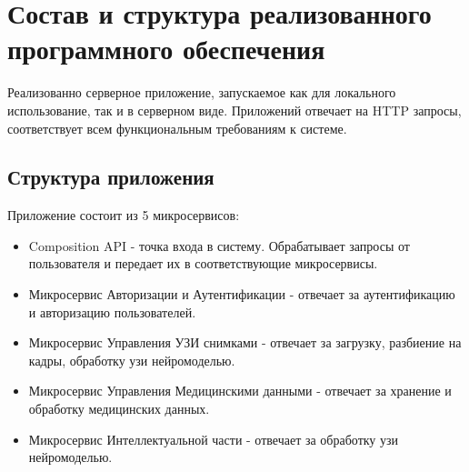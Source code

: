 


% 


\section{Состав и структура реализованного программного обеспечения}

Реализованно серверное приложение, запускаемое как для локального использование, так и в 
серверном виде. Приложений отвечает на HTTP запросы, соответствует всем функциональным требованиям к системе.

\subsection{Структура приложения}
Приложение состоит из 5 микросервисов:
\begin{itemize}
  \item Composition API - точка входа в систему. Обрабатывает запросы от пользователя и передает их в соответствующие микросервисы.
  \item Микросервис Авторизации и Аутентификации - отвечает за аутентификацию и авторизацию пользователей.
  \item Микросервис Управления УЗИ снимками - отвечает за загрузку, разбиение на кадры, обработку узи нейромоделью.
  \item Микросервис Управления Медицинскими данными - отвечает за хранение и обработку медицинских данных.
  \item Микросервис Интеллектуальной части - отвечает за обработку узи нейромоделью.
\end{itemize}

